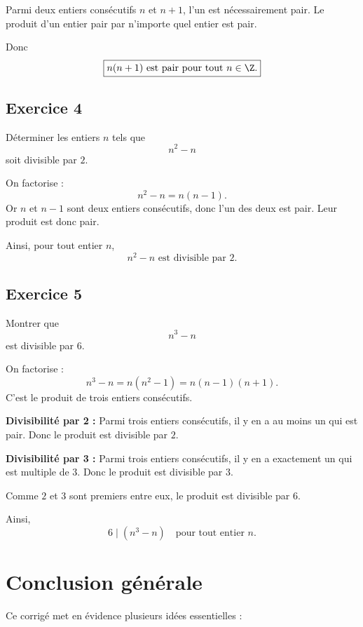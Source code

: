 \documentclass[11pt,a4paper]{article}
\begin{document}
Parmi deux entiers consécutifs \(n\) et \(n+1\), l'un est nécessairement pair.  
Le produit d'un entier pair par n'importe quel entier est pair.

Donc
\[
\boxed{n(n+1)\text{ est pair pour tout } n\in\Z.}
\]

\subsection*{Exercice 4}
Déterminer les entiers \(n\) tels que
\[
n^2-n
\]
soit divisible par \(2\).

On factorise :
\[
n^2-n=n(n-1).
\]
Or \(n\) et \(n-1\) sont deux entiers consécutifs, donc l'un des deux est pair.  
Leur produit est donc pair.

Ainsi, pour tout entier \(n\),
\[
\boxed{n^2-n \text{ est divisible par } 2.}
\]

\subsection*{Exercice 5}
Montrer que
\[
n^3-n
\]
est divisible par \(6\).

On factorise :
\[
n^3-n=n(n^2-1)=n(n-1)(n+1).
\]
C'est le produit de trois entiers consécutifs.

\textbf{Divisibilité par 2 :}  
Parmi trois entiers consécutifs, il y en a au moins un qui est pair. Donc le produit est divisible par \(2\).

\textbf{Divisibilité par 3 :}  
Parmi trois entiers consécutifs, il y en a exactement un qui est multiple de \(3\). Donc le produit est divisible par \(3\).

Comme \(2\) et \(3\) sont premiers entre eux, le produit est divisible par \(6\).

Ainsi,
\[
\boxed{6 \mid (n^3-n)\quad \text{pour tout entier } n.}
\]

\section*{Conclusion générale}

Ce corrigé met en évidence plusieurs idées essentielles :
\end{document}
